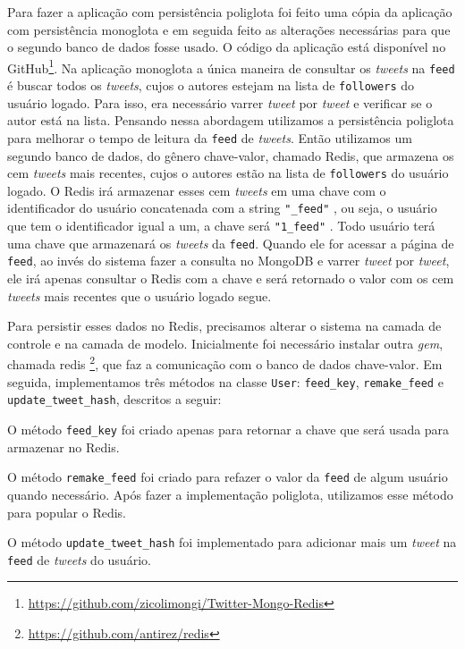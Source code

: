 Para fazer a aplicação com persistência poliglota foi feito uma cópia da aplicação com persistência monoglota e em seguida feito as alterações necessárias para que o segundo banco de dados fosse usado. O código da aplicação está disponível no GitHub\footnote{\url{https://github.com/zicolimongi/Twitter-Mongo-Redis}}.
Na aplicação monoglota a única maneira de consultar os \textit{tweets} na \verb|feed| é buscar todos os \textit{tweets}, cujos o autores estejam na lista de \verb|followers| do usuário logado. Para isso, era necessário varrer \textit{tweet} por \textit{tweet} e verificar se o autor está na lista. Pensando nessa abordagem utilizamos a persistência poliglota para melhorar o tempo de leitura da \verb|feed| de \textit{tweets}.
Então utilizamos um segundo banco de dados, do gênero chave-valor, chamado \ac{Redis}, que armazena os cem \textit{tweets} mais recentes, cujos o autores estão na lista de \verb|followers| do usuário logado.
O \ac{Redis} irá armazenar esses cem \textit{tweets} em uma chave com o identificador do usuário concatenada com a string \verb|"_feed"| , ou seja, o usuário que tem o identificador igual a um, a chave será \verb|"1_feed"| . Todo usuário terá uma chave que armazenará os \textit{tweets} da \verb|feed|. Quando ele for acessar a página de \verb|feed|, ao invés do sistema fazer a consulta no MongoDB e varrer \textit{tweet} por \textit{tweet}, ele irá apenas consultar o \ac{Redis} com a chave e será retornado o valor com os cem \textit{tweets} mais recentes que o usuário logado segue.


Para persistir esses dados no \ac{Redis}, precisamos alterar o sistema na camada de controle e na camada de modelo. Inicialmente foi necessário instalar outra \textit{gem}, chamada redis \footnote{\url{https://github.com/antirez/redis}}, que faz a comunicação com o banco de dados chave-valor. Em seguida, implementamos três métodos na classe \verb|User|: \verb|feed_key|, \verb|remake_feed| e \verb|update_tweet_hash|, descritos a seguir:

O método \verb|feed_key| foi criado apenas para retornar a chave que será usada para armazenar no \ac{Redis}.

O método \verb|remake_feed| foi criado para refazer o valor da \verb|feed| de algum usuário quando necessário. Após fazer a implementação poliglota, utilizamos esse método para popular o \ac{Redis}.

O método \verb|update_tweet_hash| foi implementado para adicionar mais um \textit{tweet} na \verb|feed| de \textit{tweets} do usuário.

